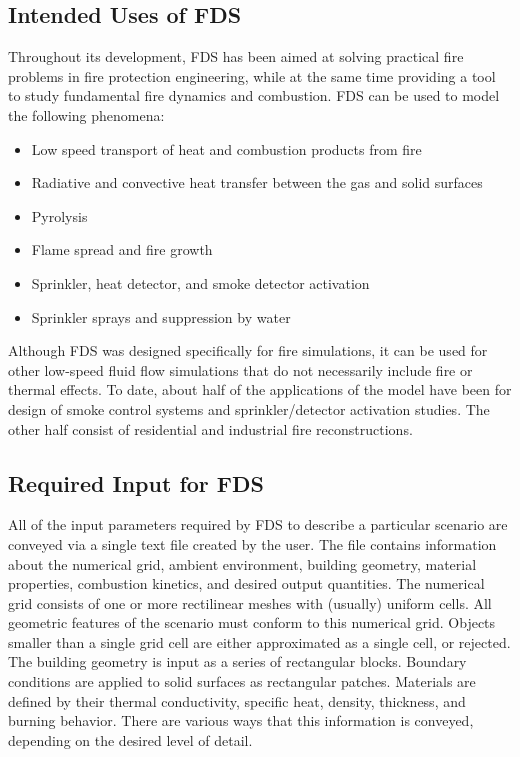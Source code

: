 \documentclass[11pt]{book}
\begin{document}
\subsection{Intended Uses of FDS}

Throughout its development, FDS has been aimed at solving practical
fire problems in fire protection engineering, while at the same time
providing a tool to study fundamental fire dynamics and combustion.
FDS can be used to model the following phenomena:
\begin{itemize}
\setlength{\itemsep}{0.0in}
\item Low speed transport of heat and combustion products from fire
\item Radiative and convective heat transfer between the gas and solid surfaces
\item Pyrolysis
\item Flame spread and fire growth
\item Sprinkler, heat detector, and smoke detector activation
\item Sprinkler sprays and suppression by water
\end{itemize}
Although FDS was designed specifically for fire simulations,
it can be used for other low-speed fluid flow simulations that do not necessarily
include fire or thermal effects. To date, about half of the
applications of the model have been for design of smoke control
systems and sprinkler/detector activation studies.
The other half consist of residential and industrial fire reconstructions.


\subsection{Required Input for FDS}

All of the input parameters required by FDS to describe a particular
scenario are conveyed via a single text file created by the user.
The file contains information about the numerical grid, ambient environment, building geometry, material
properties, combustion kinetics, and desired output quantities.
The numerical grid consists of one or more rectilinear meshes with (usually) uniform cells. All geometric features of the
scenario must conform to this numerical grid. Objects smaller than a single grid cell are either approximated
as a single cell, or rejected. The building geometry is input as a series of rectangular blocks. Boundary conditions are
applied to solid surfaces as rectangular patches. Materials are defined by their thermal conductivity, specific heat,
density, thickness, and burning behavior. There are various ways that this information is conveyed, depending on the
desired level of detail.
\end{document}
